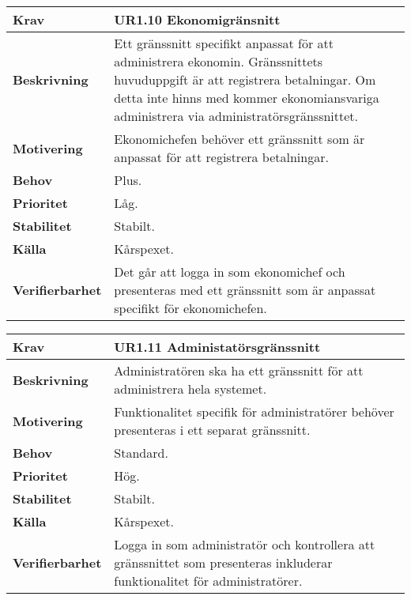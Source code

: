 \documentclass[a4paper, twoside, 11pt, titlepage]{article}
\begin{document}
		\begin{tabular} { p{2.6cm} p{12.5cm} }
			\hline
			\sffamily\textbf{Krav} & \sffamily\textbf{UR1.10 Ekonomigränsnitt  } \\
			\hline
			\sffamily\textbf{Beskrivning} & Ett gränssnitt specifikt anpassat för att administrera ekonomin. Gränssnittets huvuduppgift är att registrera betalningar. Om detta inte hinns med kommer ekonomiansvariga administrera via administratörsgränssnittet.  \\
			\hline
			\sffamily\textbf{Motivering} & Ekonomichefen behöver ett gränssnitt som är anpassat för att registrera betalningar.  \\
			\hline
			\sffamily\textbf{Behov} & Plus.  \\
			\hline
			\sffamily\textbf{Prioritet} & Låg.  \\
			\hline
			\sffamily\textbf{Stabilitet} & Stabilt.  \\
			\hline
			\sffamily\textbf{Källa} & Kårspexet.  \\
			\hline
			\sffamily\textbf{Verifierbarhet} & Det går att logga in som ekonomichef och presenteras med ett gränssnitt som är anpassat specifikt för ekonomichefen.  \\
			\hline
		\end{tabular}
		\vspace{6mm}

		\begin{tabular} { p{2.6cm} p{12.5cm} }
			\hline
			\sffamily\textbf{Krav} & \sffamily\textbf{UR1.11 Administatörsgränssnitt  } \\
			\hline
			\sffamily\textbf{Beskrivning} & Administratören ska ha ett gränssnitt för att administrera hela systemet.  \\
			\hline
			\sffamily\textbf{Motivering} & Funktionalitet specifik för administratörer behöver presenteras i ett separat gränssnitt.  \\
			\hline
			\sffamily\textbf{Behov} & Standard.  \\
			\hline
			\sffamily\textbf{Prioritet} & Hög.  \\
			\hline
			\sffamily\textbf{Stabilitet} & Stabilt.  \\
			\hline
			\sffamily\textbf{Källa} & Kårspexet.  \\
			\hline
			\sffamily\textbf{Verifierbarhet} & Logga in som administratör och kontrollera att gränssnittet som presenteras inkluderar funktionalitet för administratörer.  \\
			\hline
		\end{tabular}
		\vspace{6mm}
\end{document}
